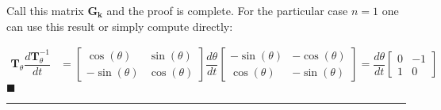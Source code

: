 	Call this matrix $\mathbf{G_k}$ and the proof is complete. For the particular case $n=1$ one can use this result or simply compute directly:

\begin{align}
	\mathbf{T}_\theta\dfrac{d\mathbf{T}^{-1}_\theta}{dt} &= 
	\left[\begin{array}{cc}
		 \cos\left(\theta\right) & \sin\left(\theta\right) \\[5mm]
		-\sin\left(\theta\right) & \cos\left(\theta\right)
	\end{array}\right]\dfrac{d\theta}{dt}
	\left[\begin{array}{cc}
		-\sin\left(\theta\right) & -\cos\left(\theta\right) \\[5mm]
		\cos\left(\theta\right) & -\sin\left(\theta\right)
	\end{array}\right]
	=\dfrac{d\theta}{dt}\left[\begin{array}{ccc}
		0 & -1 \\[5mm]
		1 &  0
	\end{array}\right]
\end{align}
\hfill$\blacksquare$

\vspace{5mm}
\hrule
\vspace{5mm}


